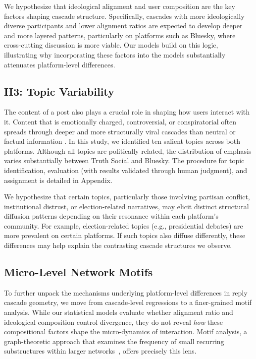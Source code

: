\documentclass[letterpaper]{article} %
\begin{document}
We hypothesize that ideological alignment and user composition are the key factors shaping cascade structure. Specifically, cascades with more ideologically diverse participants and lower alignment ratios are expected to develop deeper and more layered patterns, particularly on platforms such as Bluesky, where cross-cutting discussion is more viable. Our models build on this logic, illustrating why incorporating these factors into the models substantially attenuates platform-level differences.

\subsection{H3: Topic Variability}
The content of a post also plays a crucial role in shaping how users interact with it. Content that is emotionally charged, controversial, or conspiratorial often spreads through deeper and more structurally viral cascades than neutral or factual information \cite{vosoughi_spread_2018, wang_factors_2022}. In this study, we identified ten salient topics across both platforms. Although all topics are politically related, the distribution of emphasis varies substantially between Truth Social and Bluesky. The procedure for topic identification, evaluation (with results validated through human judgment), and assignment is detailed in Appendix.

We hypothesize that certain topics, particularly those involving partisan conflict, institutional distrust, or election-related narratives, may elicit distinct structural diffusion patterns depending on their resonance within each platform’s community. For example, election-related topics (e.g., presidential debates) are more prevalent on certain platforms. If such topics also diffuse differently, these differences may help explain the contrasting cascade structures we observe.

\subsection{Micro-Level Network Motifs}
To further unpack the mechanisms underlying platform-level differences in reply cascade geometry, we move from cascade-level regressions to a finer-grained motif analysis. While our statistical models evaluate whether alignment ratio and ideological composition control divergence, they do not reveal \textit{how} these compositional factors shape the micro-dynamics of interaction. Motif analysis, a graph-theoretic approach that examines the frequency of small recurring substructures within larger networks~\cite{alon_network_2007}, offers precisely this lens. 
\end{document}
